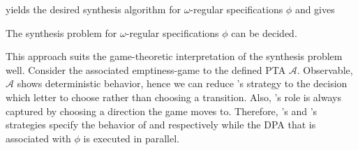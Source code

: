 yields the desired synthesis algorithm for $\omega$-regular specifications 
$\phi$ and gives
\begin{theorem}
  \cite[Theorem 21, Theorem 22]{AutoInfObj}
  The synthesis problem for $\omega$-regular specifications $\phi$ can be 
  decided.
\end{theorem}
This approach suits the game-theoretic interpretation of the synthesis problem
well. Consider the associated emptiness-game to the defined \ac{PTA} 
$\mathcal{A}$. Observable, $\mathcal{A}$ shows deterministic behavior, hence 
we can reduce \eve{}'s strategy to the decision which letter to choose rather
than choosing a transition. Also, \adam{}'s role is always captured by choosing
a direction the game moves to. Therefore, \eve{}'s and \adam{}'s strategies 
specify the behavior of \outputp{} and  respectively while the 
\ac{DPA} that is associated with $\phi$ is executed in parallel.

